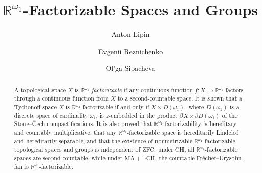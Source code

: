 \documentclass[a4paper,12pt]{amsart}
\theoremstyle{definition}
\theoremstyle{remark}
\begin{document}
{
\renewcommand*{\thefootnote}{$\star$}

\title{$\mathbb R^{\omega_1}$-Factorizable Spaces and Groups}
 }

\author{Anton Lipin}
\address{Krasovskii Institute of Mathematics and Mechanics, ul.~S.~Kovalevskoi 16,  Yekaterinburg,
            620990 Russia \\
Ural Federal University, ul.~Mira 19, Yekaterinburg, 620002 Russia}

\author{Evgenii Reznichenko}
\address{Department of General Topology and Geometry, Faculty of Mechanics and  Mathematics, 
M.~V.~Lomonosov Moscow State University, Leninskie Gory 1, Moscow, 199991 Russia}


\author{Ol'ga Sipacheva}
\address{Department of General Topology and Geometry, Faculty of Mechanics and  Mathematics, 
M.~V.~Lomonosov Moscow State University, Leninskie Gory 1, Moscow, 199991 Russia}


\begin{abstract}
A topological space $X$ is \emph{$\mathbb R^{\omega_1}$-factorizable} if any continuous function $f\colon X\to 
\mathbb R^{\omega_1}$ factors through a continuous function from $X$ to a second-countable space. It is shown 
that a Tychonoff space $X$ is $\mathbb R^{\omega_1}$-factorizable if and only if $X\times D(\omega_1)$, where 
$D(\omega_1)$ is a discrete space of cardinality $\omega_1$, is $z$-embedded in the product $\beta X\times \beta 
D(\omega_1)$ of the Stone--\v Cech compactifications. It is also proved that $\mathbb 
R^{\omega_1}$-factorizability is hereditary and countably multiplicative, that any $\mathbb 
R^{\omega_1}$-factorizable space is hereditarily Lindel\"of and hereditarily separable, and that the existence of 
nonmetrizable $\mathbb R^{\omega_1}$-factorizable topological spaces and groups is independent of $\mathrm{ZFC}$: 
under $\mathrm{CH}$, all $\mathbb R^{\omega_1}$-factorizable spaces are second-countable, while under 
$\mathrm{MA}+\lnot\mathrm{CH}$, the countable Fr\'echet--Urysohn fan  is $\mathbb R^{\omega_1}$-factorizable. 
\end{abstract}

\end{document}
